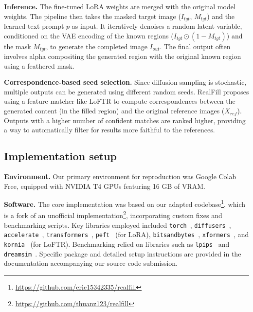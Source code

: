 \documentclass{article}
\begin{document}
\textbf{Inference.} The fine-tuned LoRA weights are merged with the original model weights. The pipeline then takes the masked target image ($I_{tgt}$, $M_{tgt}$) and the learned text prompt $p$ as input. It iteratively denoises a random latent variable, conditioned on the VAE encoding of the known regions ($I_{tgt} \odot (1-M_{tgt})$) and the mask $M_{tgt}$, to generate the completed image $I_{out}$. The final output often involves alpha compositing the generated region with the original known region using a feathered mask.

\textbf{Correspondence-based seed selection.} Since diffusion sampling is stochastic, multiple outputs can be generated using different random seeds. RealFill proposes using a feature matcher like LoFTR \cite{sun2021loftr} to compute correspondences between the generated content (in the filled region) and the original reference images ($X_{ref}$). Outputs with a higher number of confident matches are ranked higher, providing a way to automatically filter for results more faithful to the references.

\subsection{Implementation setup}
\label{subsec:implementation_setup} %

\textbf{Environment.} Our primary environment for reproduction was Google Colab Free, equipped with NVIDIA T4 GPUs featuring 16 GB of VRAM.

\textbf{Software.} The core implementation was based on our adapted codebase\footnote{\url{https://github.com/eric15342335/realfill}}, which is a fork of an unofficial implementation\footnote{\url{https://github.com/thuanz123/realfill}}, incorporating custom fixes and benchmarking scripts. Key libraries employed included \texttt{torch}~\cite{ansel2024pytorch}, \texttt{diffusers}~\cite{vonplaten2022diffusers}, \texttt{accelerate}~\cite{accelerate}, \texttt{transformers}~\cite{wolf2020transformers}, \texttt{peft}~\cite{peft} (for LoRA), \texttt{bitsandbytes}~\cite{dettmers2021_8bit}, \texttt{xformers}~\cite{xFormers2022}, and \texttt{kornia}~\cite{riba2020kornia} (for LoFTR). Benchmarking relied on libraries such as \texttt{lpips}~\cite{zhang2018unreasonable} and \texttt{dreamsim}~\cite{fu2023dreamsim}. Specific package and detailed setup instructions are provided in the documentation accompanying our source code submission.
\end{document}
